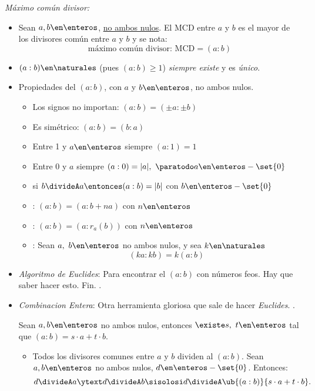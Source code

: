 \def\mcd{(a:b)}
\def\D{\mathcal D}
\def\cz{s\cdot a + t \cdot b}

\textit{Máximo común divisor: }

\begin{itemize}[label=\tiny{}]
  \item Sean $a,b \en \enteros$, \underline{no ambos nulos}. El MCD entre $a$ y $b$ es el mayor de los divisores
        común entre $a$ y $b$ y se nota:
        $$
          \boxed{
            \text{máximo común divisor: MCD}= \mcd
          }
        $$

  \item $\mcd \en \naturales$ (pues $\mcd \geq 1$) \textit{siempre existe} y es \textit{único}.

  \item Propiedades del $(a:b)$, con $a$ y $b \en \enteros$, no ambos nulos.\par
        \begin{itemize}[label={\tiny{}}]
          \item Los signos no importan: $\mcd = (\pm a : \pm b)$
          \item Es simétrico: $\mcd = (b:a)$
          \item Entre 1 y $a \en \enteros$ siempre $(a:1) = 1$
          \item Entre 0 y $a$ siempre $(a:0) = |a|,\ \paratodo a \en \enteros -\set{0}$
          \item si $b \divideA a \entonces \mcd = |b|$ con $b \en \enteros - \set{0}$
          \item {}: $\mcd = (a: b+na)$ con $n \en \enteros$
          \item {}: $\mcd = (a: r_a(b))$ con $n \en \enteros$
          \item {}: Sean $a,\ b \en \enteros$ no ambos nulos, y sea $k \en \naturales$
                $$
                  (ka:kb) = k(a:b)
                $$
        \end{itemize}

  \item \textit{Algoritmo de Euclides}: Para encontrar el $(a:b)$ con números feos. Hay que saber hacer esto. Fin.
        .\par

  \item \textit{Combinacion Entera}: Otra herramienta gloriosa que sale de hacer \textit{Euclides}.
        .\par
        Sean $a,b \en \enteros$ no ambos nulos, entonces $\existe s,\ t \en \enteros$ tal que $\mcd = \cz$.
        \begin{itemize}[label=\tiny{}]
          \item Todos los divisores comunes entre $a$ y $b$ dividen al $\mcd$. Sean $a,b \en \enteros$ no ambos nulos, $d \en \enteros - \set{0}$. Entonces:
                $$
                  d \divideA a \ytext d \divideA b \sisolosi d \divideA \ub{\mcd}{\cz}.
                $$


\end{itemize}
\end{itemize}
